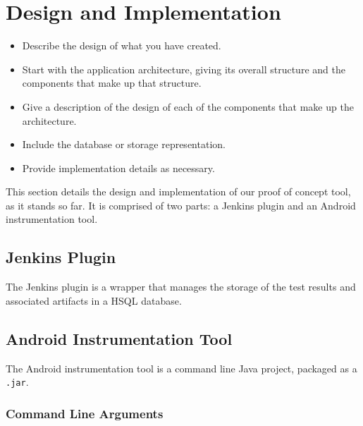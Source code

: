 \section{Design and Implementation}
\label{sec:imp}

\begin{mdframed}
	\begin{itemize}
		\item Describe the design of what you have created.
		\item Start with the application architecture, giving its overall structure and the components that make up that structure.
		\item Give a description of the design of each of the components that make up the architecture.
		\item Include the database or storage representation.
		\item Provide implementation details as necessary.
	\end{itemize}
\end{mdframed}


This section details the design and implementation of our proof of concept tool, as it stands so far. It is comprised of two parts: a Jenkins plugin and an Android instrumentation tool.


\subsection{Jenkins Plugin}

The Jenkins plugin is a wrapper that manages the storage of the test results and associated artifacts in a HSQL database.


\subsection{Android Instrumentation Tool}

The Android instrumentation tool is a command line Java project, packaged as a \texttt{.jar}.

\subsubsection{Command Line Arguments}

